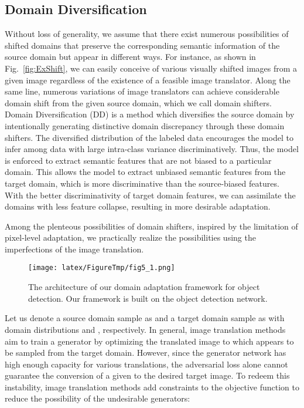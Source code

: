 \documentclass[10pt,twocolumn,letterpaper]{article}
\begin{document}
\subsection{Domain Diversification} \label{sec:DD}
Without loss of generality, we assume that there exist numerous possibilities of shifted domains that preserve the corresponding semantic information of the source domain but appear in different ways.
For instance, as shown in Fig.~\ref{fig:ExShift}, we can easily conceive of various visually shifted images from a given image regardless of the existence of a feasible image translator.
Along the same line, numerous variations of image translators can achieve considerable domain shift from the given source domain, which we call domain shifters.
Domain Diversification (DD) is a method which diversifies the source domain by intentionally generating distinctive domain discrepancy through these domain shifters.
The diversified distribution of the labeled data encourages the model to infer among data with large intra-class variance discriminatively.
Thus, the model is enforced to extract semantic features that are not biased to a particular domain.
This allows the model to extract unbiased semantic features from the target domain, which is more discriminative than the source-biased features.
With the better discriminativity of target domain features, we can assimilate the domains with less feature collapse, resulting in more desirable adaptation.


Among the plenteous possibilities of domain shifters, inspired by the limitation of pixel-level adaptation, we practically realize the possibilities using the imperfections of the image translation.
\begin{figure*}
\begin{center}
\texttt{[image: latex/FigureTmp/fig5\_1.png]}
\end{center}
  \caption{The architecture of our domain adaptation framework for object detection. Our framework is built on the object detection network.}
\label{fig:NetArch}
\end{figure*}
Let us denote a source domain sample as  and a target domain sample as  with domain distributions  and , respectively.
In general, image translation methods aim to train a generator  by optimizing the translated image  to which appears to be sampled from the target domain.
However, since the generator network has high enough capacity for various translations, the adversarial loss alone cannot guarantee the conversion of a given  to the desired target image.
To redeem this instability, image translation methods add constraints to the objective function  to reduce the possibility of the undesirable generators:
\end{document}
